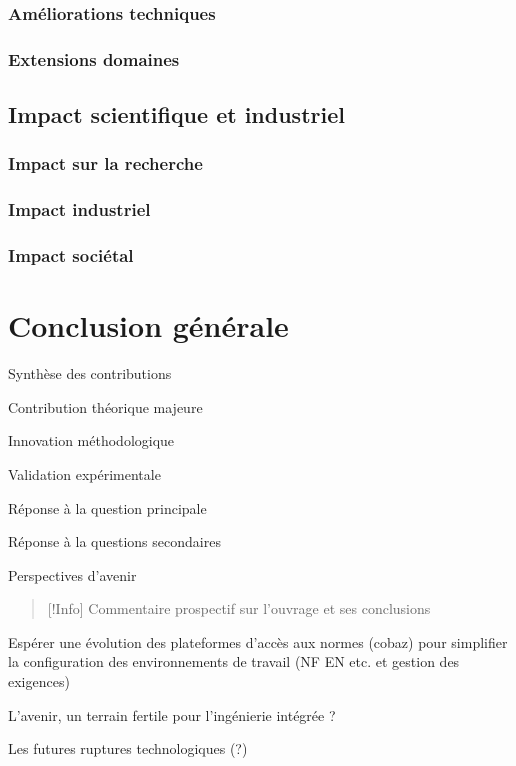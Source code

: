 \documentclass[a4paper,12pt]{article}
\begin{document}
\subsubsection{Améliorations techniques}
\label{sec:org484d27d}
\subsubsection{Extensions domaines}
\label{sec:org7174e8b}
\subsection{Impact scientifique et industriel}
\label{sec:org4f1466c}
\subsubsection{Impact sur la recherche}
\label{sec:org5373fbe}
\subsubsection{Impact industriel}
\label{sec:org46baa28}
\subsubsection{Impact sociétal}
\label{sec:org9f542f4}
\clearpage
\section{Conclusion générale}
\label{sec:org939865c}
Synthèse des contributions

Contribution théorique majeure

Innovation méthodologique

Validation expérimentale

Réponse à la question principale

Réponse à la questions secondaires

Perspectives d'avenir


\begin{quote}
{[}!Info] Commentaire prospectif sur l'ouvrage et ses conclusions
\end{quote}

Espérer une évolution des plateformes d'accès aux normes (cobaz) pour simplifier la configuration des environnements de travail (NF EN etc. et gestion des exigences)

L'avenir, un terrain fertile pour l'ingénierie intégrée ?

Les futures ruptures technologiques (?)
\clearpage
\end{document}
